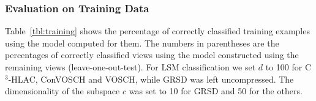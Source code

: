 \documentclass[letterpaper, 10 pt, conference]{sty/ieeeconf}
\begin{document}


\subsubsection{Evaluation on Training Data}
Table~\ref{tbl:training} shows the percentage of correctly classified training examples using the model computed for them.
The numbers in parentheses are the percentages of correctly classified views using the model constructed using the remaining views
(leave-one-out-test).
For LSM classification we set $d$ to 
100 for C$^3$-HLAC, ConVOSCH and VOSCH, while GRSD was left uncompressed. 
The dimensionality of the subspace $c$ was set to 10 for GRSD and 50 for the others.

\end{document}
